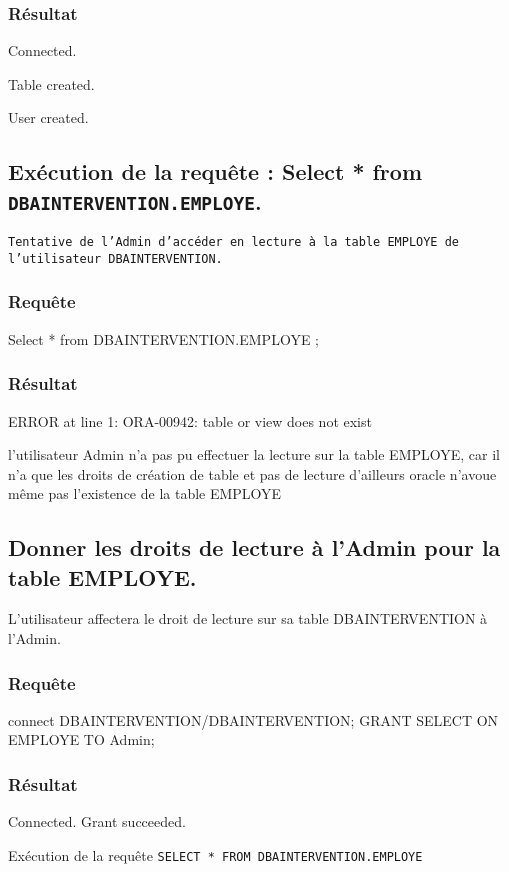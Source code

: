 \documentclass[•]{article}
\begin{document}
\subsubsection{Résultat}
\begin{sql}
Connected.

Table created.

User created.
\end{sql}


\subsection{Exécution de la requête : Select * from \texttt{DBAINTERVENTION.EMPLOYE}.}
\texttt{Tentative de l'Admin d'accéder en lecture à la table EMPLOYE de l'utilisateur DBAINTERVENTION. }
\subsubsection{Requête}
\begin{sql}
Select * from DBAINTERVENTION.EMPLOYE ;
\end{sql}
\subsubsection{Résultat}
\begin{sql}
ERROR at line 1:
ORA-00942: table or view does not exist
\end{sql}

\textrm{l'utilisateur Admin n'a pas pu effectuer la lecture sur la table EMPLOYE,
car il n'a que les droits de création de table et pas de lecture
d'ailleurs oracle n'avoue même pas l'existence de la table EMPLOYE}

\subsection{Donner les droits de lecture à l'Admin pour la table EMPLOYE. }
\textrm{L'utilisateur affectera le droit de lecture sur sa table DBAINTERVENTION à l'Admin. }
\subsubsection{Requête}
\begin{sql}
connect DBAINTERVENTION/DBAINTERVENTION;
GRANT SELECT ON EMPLOYE TO Admin;
\end{sql}
\subsubsection{Résultat}
\begin{sql}
Connected.
Grant succeeded.
\end{sql}
\textrm{Exécution de la requête \texttt{SELECT * FROM DBAINTERVENTION.EMPLOYE}}
\end{document}
